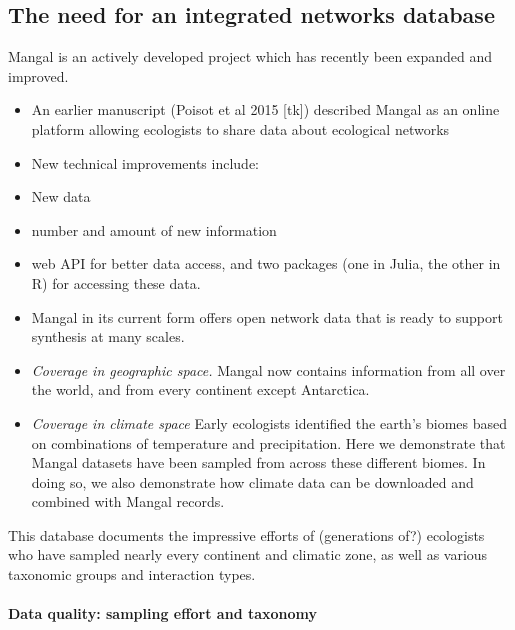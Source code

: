 \hypertarget{the-need-for-an-integrated-networks-database}{%
\subsection{The need for an integrated networks
database}\label{the-need-for-an-integrated-networks-database}}

Mangal is an actively developed project which has recently been expanded
and improved.

\begin{itemize}
\tightlist
\item
  An earlier manuscript (Poisot et al 2015 {[}tk{]}) described Mangal as
  an online platform allowing ecologists to share data about ecological
  networks
\item
  New technical improvements include:
\item
  New data
\item
  number and amount of new information
\item
  web API for better data access, and two packages (one in Julia, the
  other in R) for accessing these data.
\item
  Mangal in its current form offers open network data that is ready to
  support synthesis at many scales.
\end{itemize}

\begin{itemize}
\item
  \emph{Coverage in geographic space.} Mangal now contains information
  from all over the world, and from every continent except Antarctica. 
\item
  \emph{Coverage in climate space} Early ecologists identified the
  earth's biomes based on combinations of temperature and precipitation.
  Here we demonstrate that Mangal datasets have been sampled from across
  these different biomes. In doing so, we also demonstrate how climate
  data can be downloaded and combined with Mangal records. 
\end{itemize}

This database documents the impressive efforts of (generations of?)
ecologists who have sampled nearly every continent and climatic zone, as
well as various taxonomic groups and interaction types.

\hypertarget{data-quality-sampling-effort-and-taxonomy}{%
\paragraph{Data quality: sampling effort and
taxonomy}\label{data-quality-sampling-effort-and-taxonomy}}

